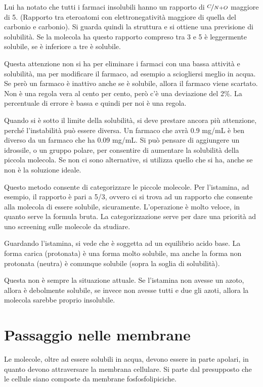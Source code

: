 Lui ha notato che tutti i farmaci insolubili hanno un rapporto
di $\nicefrac{C}{N+O}$ maggiore di 5. (Rapporto tra eteroatomi con
elettronegatività maggiore di quella del carbonio e carbonio).
Si guarda quindi la struttura e si ottiene una previsione di solubilità.
Se la molecola ha questo rapporto compreso tra 3 e 5 è leggermente
solubile, se è inferiore a tre è solubile.


Questa attenzione non si ha per eliminare i farmaci con una bassa
attività e solubilità, ma per modificare il farmaco, ad esempio a
sciogliersi meglio in acqua. Se però un farmaco è inattivo anche se è
solubile, allora il farmaco viene scartato.
Non è una regola vera al cento per cento, però c'è una deviazione del
2\%. La percentuale di errore è bassa e quindi per noi è una regola.

Quando si è sotto il limite della solubilità, si deve prestare ancora
più attenzione, perché l'instabilità può essere diversa. Un farmaco che
avrà 0.9 mg/mL è ben diverso da un farmaco che ha 0.09 mg/mL.
Si può pensare di aggiungere un idrossile, o un gruppo polare, per
consentire di aumentare la solubilità della piccola molecola.
Se non ci sono alternative, si utilizza quello che si ha, anche se non è
la soluzione ideale.

Questo metodo consente di categorizzare le piccole molecole. Per
l'istamina, ad esempio, il rapporto è pari a 5/3, ovvero ci si trova ad
un rapporto che consente alla molecola di essere solubile, sicuramente.
L'operazione è molto veloce, in quanto serve la formula bruta.
La categorizzazione serve per dare una priorità ad uno screening sulle
molecole da studiare.

Guardando l'istamina, si vede che è soggetta ad un equilibrio acido
base. La forma carica (protonata) è una forma molto solubile, ma anche
la forma non protonata (neutra) è comunque solubile (sopra la soglia di
solubilità).

Questa non è sempre la situazione attuale. Se l'istamina non avesse un
azoto, allora è debolmente solubile, se invece non avesse tutti e due
gli azoti, allora la molecola sarebbe proprio insolubile.

\section{Passaggio nelle membrane}

Le molecole, oltre ad essere solubili in acqua, devono essere in parte apolari, in quanto devono attraversare la membrana cellulare. Si parte dal presupposto che le
cellule siano composte da membrane fosfosfolipiciche.

